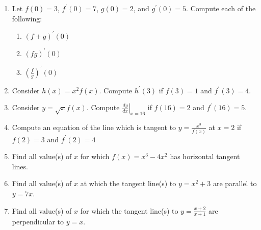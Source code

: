 \documentclass[12pt]{article}
\newif\ifans
\begin{document}
\begin{enumerate}
\ifans{\fbox{$\displaystyle \left.y^{\prime}\right|_{x=1}=10$}} \fi

\item Let $f(0)=3$, $f^{\prime}(0)=7$, $g(0)=2$, and $g^{\prime}(0)=5$.  Compute each of the following:

\begin{enumerate}

\item $\left(f+g\right)^{\prime}(0)$

\ifans{\fbox{12}} \fi

\item $\left(fg \right)^{\prime}(0)$

\ifans{\fbox{29}} \fi

\item $\displaystyle \left(\frac{f}{g}\right)^{\prime}(0)$

\ifans{\fbox{$\displaystyle -\frac{1}{4}$}} \fi

\end{enumerate}

\item Consider $h(x)=x^2f(x)$.  Compute $h^{\prime}(3)$ if $f(3)=1$ and $f^{\prime}(3)=4$.

\ifans{\fbox{42}} \fi

\item Consider $y=\sqrt{x}f(x)$.  Compute $\displaystyle \left.\frac{dy}{dx}\right|_{x=16}$ if $f(16)=2$ and $f^{\prime}(16)=5$.

\ifans{\fbox{20.25}} \fi

\item Compute an equation of the line which is tangent to $\displaystyle y=\frac{x^3}{f(x)}$ at $x=2$ if $f(2)=3$ and $f^{\prime}(2)=4$

\ifans{\fbox{$\displaystyle y-\frac{8}{3}=\frac{4}{9}(x-2)$}} \fi

\item Find all value(s) of $x$ for which $f(x)=x^3-4x^2$ has horizontal tangent lines.

\ifans{\fbox{$x=0$ and $\displaystyle x=\frac{8}{3}$}} \fi

\item Find all value(s) of $x$ at which the tangent line(s) to $y=x^2+3$ are parallel to $y=7x$.

\ifans{\fbox{$\displaystyle x=\frac{7}{2}$}} \fi

\item Find all value(s) of $x$ for which the tangent line(s) to $\displaystyle y=\frac{x+2}{x+1}$ are perpendicular to $y=x$.


\end{enumerate}
\end{document}
